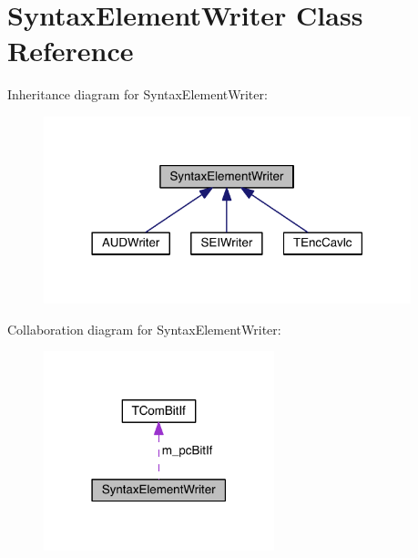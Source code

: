 \hypertarget{class_syntax_element_writer}{}\section{Syntax\+Element\+Writer Class Reference}
\label{class_syntax_element_writer}


Inheritance diagram for Syntax\+Element\+Writer\+:
\nopagebreak
\begin{figure}[H]
\begin{center}
\leavevmode
\includegraphics[width=302pt]{d0/dca/class_syntax_element_writer__inherit__graph}
\end{center}
\end{figure}


Collaboration diagram for Syntax\+Element\+Writer\+:
\nopagebreak
\begin{figure}[H]
\begin{center}
\leavevmode
\includegraphics[width=190pt]{dd/df0/class_syntax_element_writer__coll__graph}
\end{center}
\end{figure}
